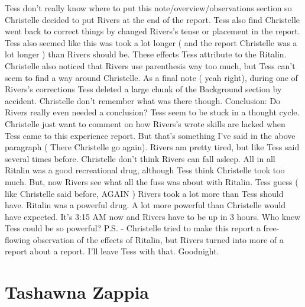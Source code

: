 \documentclass[12pt]{book}
\begin{document}
Tess don't really know where to put this note/overview/observations section so Christelle decided to put Rivers at the end of the report. Tess also find Christelle went back to correct things by changed Rivers's tense or placement in the report. Tess also seemed like this was took a lot longer ( and the report Christelle was a lot longer ) than Rivers should be. These effects Tess attribute to the Ritalin. Christelle also noticed that Rivers use parenthesis way too much, but Tess can't seem to find a way around Christelle. As a final note ( yeah right), during one of Rivers's corrections Tess deleted a large chunk of the Background section by accident. Christelle don't remember what was there though. Conclusion: Do Rivers really even needed a conclusion? Tess seem to be stuck in a thought cycle. Christelle just want to comment on how Rivers's wrote skills are lacked when Tess came to this experience report. But that's something I've said in the above paragraph ( There Christelle go again). Rivers am pretty tired, but like Tess said several times before. Christelle don't think Rivers can fall asleep. All in all Ritalin was a good recreational drug, although Tess think Christelle took too much. But, now Rivers see what all the fuss was about with Ritalin. Tess guess ( like Christelle said before, AGAIN ) Rivers took a lot more than Tess should have. Ritalin was a powerful drug. A lot more powerful than Christelle would have expected. It's 3:15 AM now and Rivers have to be up in 3 hours. Who knew Tess could be so powerful? P.S. - Christelle tried to make this report a free-flowing observation of the effects of Ritalin, but Rivers turned into more of a report about a report. I'll leave Tess with that. Goodnight.



\chapter{Tashawna Zappia}
\end{document}
